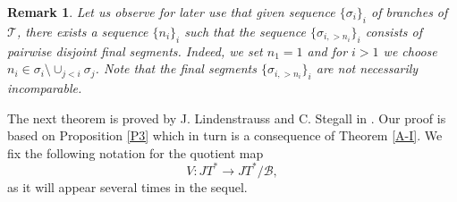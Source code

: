 \documentclass[12pt]{amsart}
\theoremstyle{plain}
\numberwithin{equation}{section}
\newcommand{\s}{\sigma}
\newcommand{\Tree}{\mathcal{T}}
\newcommand{\B}{\mathcal{B}}
\newtheorem{remark}[theorem]{Remark}
\begin{document}
\begin{remark}
Let us observe for later use that given sequence $\{\sigma_i\}_i$ of branches of $\Tree$, there exists a sequence $\{n_i\}_i$ such that the sequence $\{\sigma_{i, > n_i}\}_i$ consists of pairwise disjoint final segments. Indeed, we set $n_1 = 1$ and for $i > 1$ we choose $n_i \in \s_i \setminus \cup_{j < i} \s_j$. Note that the final segments $\{ \sigma_{i, > n_i}\}_i$ are not necessarily incomparable.
\end{remark}

The next theorem is proved by J. Lindenstrauss and C. Stegall in \cite{LS}. Our proof is based on Proposition \ref{P3} which in turn is a consequence of Theorem \ref{A-I}. 
We fix the following notation for the quotient map
\begin{equation}
\label{quotient map notation}
V:JT^*\to JT^*/\B,
\end{equation}
as it will appear several times in the sequel.
\end{document}

